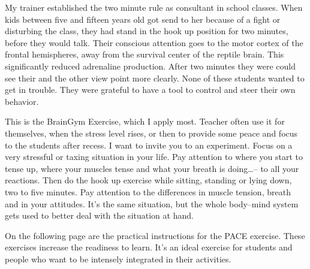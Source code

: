 \documentclass[../main.tex]{subfiles}
\begin{document}
My trainer established the two minute rule as consultant in school classes.
When kids between five and fifteen years old got send to her because of a fight or disturbing the
class,
they had stand in the hook up position for two minutes, before they would talk.
Their conscious attention goes to the motor cortex of the frontal hemispheres, away from the survival center of the reptile brain.
This significantly reduced adrenaline production.
After two minutes they were could see their and the other view point more clearly.
None of these students wanted to get in trouble. They were grateful to have a tool to control and steer their own behavior.

This is the BrainGym Exercise, which I apply most.
Teacher often use it for themselves, when the stress level rises, or then to provide some peace and focus to the students after recess.
I want to invite you to an experiment.
Focus on a very stressful or taxing situation in your life.
Pay attention to where you start to tense up, where your muscles tense and what your breath is doing\ldots -- to all your reactions.
Then do the hook up exercise while sitting, standing or lying down, two to five minutes.
Pay attention to the differences in muscle tension, breath and in your attitudes.
It's the same situation, but the whole body--mind system gets used to better deal with the situation at hand.

On the following page are the practical instructions for the PACE exercise. These exercises increase the readiness to learn.
It's an ideal exercise for students and people who want to be intensely integrated in their activities.
\newpage
\end{document}

